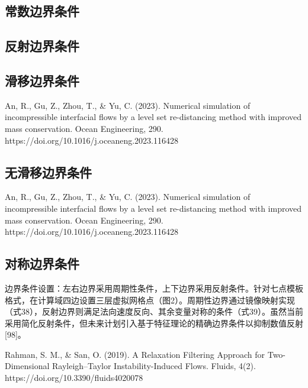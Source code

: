 \documentclass{book}
\begin{document}
\subsection{常数边界条件}
\subsection{反射边界条件}
\subsection{滑移边界条件}
An, R., Gu, Z., Zhou, T., \& Yu, C. (2023). Numerical simulation of incompressible interfacial flows by a level set re-distancing method with improved mass conservation. Ocean Engineering, 290. https://doi.org/10.1016/j.oceaneng.2023.116428 
\subsection{无滑移边界条件}
An, R., Gu, Z., Zhou, T., \& Yu, C. (2023). Numerical simulation of incompressible interfacial flows by a level set re-distancing method with improved mass conservation. Ocean Engineering, 290. https://doi.org/10.1016/j.oceaneng.2023.116428 
\subsection{对称边界条件}
边界条件设置：左右边界采用周期性条件，上下边界采用反射条件。针对七点模板格式，在计算域四边设置三层虚拟网格点（图2）。周期性边界通过镜像映射实现（式38），反射边界则满足法向速度反向、其余变量对称的条件（式39）。虽然当前采用简化反射条件，但未来计划引入基于特征理论的精确边界条件以抑制数值反射[98]。

Rahman, S. M., \& San, O. (2019). A Relaxation Filtering Approach for Two-Dimensional Rayleigh–Taylor Instability-Induced Flows. Fluids, 4(2). https://doi.org/10.3390/fluids4020078 



\end{document}
